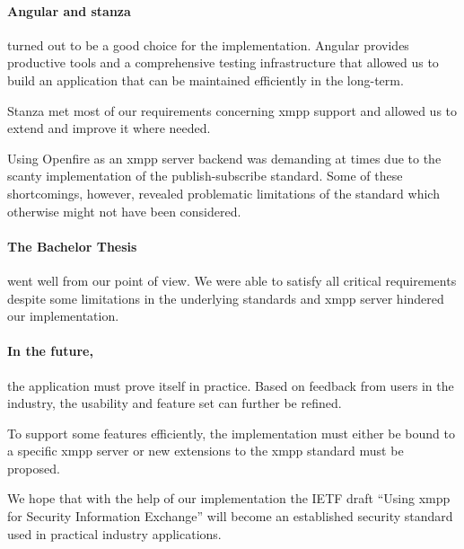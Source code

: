 \paragraph{Angular and stanza} turned out to be a good choice for the implementation.
Angular provides productive tools and a comprehensive testing infrastructure that allowed us to build an application that can be maintained efficiently in the long-term.

Stanza met most of our requirements concerning \gls{xmpp} support and allowed us to extend and improve it where needed.

Using Openfire as an \gls{xmpp} server backend was demanding at times due to the scanty implementation of the \gls{publish-subscribe} standard.
Some of these shortcomings, however, revealed problematic limitations of the standard which otherwise might not have been considered.

\paragraph{The Bachelor Thesis} went well from our point of view.
We were able to satisfy all critical requirements despite some limitations in the underlying standards and \gls{xmpp} server hindered our implementation.

\paragraph{In the future,} the application must prove itself in practice.
Based on feedback from users in the industry, the usability and feature set can further be refined.

To support some features efficiently, the implementation must either be bound to a specific \gls{xmpp} server or new extensions to the \gls{xmpp} standard must be proposed.

We hope that with the help of our implementation the IETF draft ``Using \gls{xmpp} for Security Information Exchange'' will become an established security standard used in practical industry applications.
